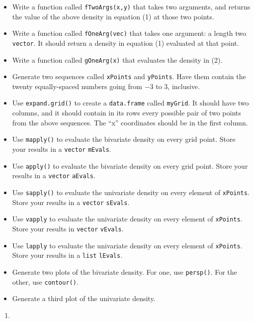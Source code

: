 \documentclass[
  12pt,
  krantz2]{krantz}
\providecommand{\tightlist}{%
  \setlength{\itemsep}{0pt}\setlength{\parskip}{0pt}}
\begin{document}
\begin{itemize}
\tightlist
\item
  Write a function called \texttt{fTwoArgs(x,y)} that takes two arguments, and returns the value of the above density in equation (1) at those two points.
\item
  Write a function called \texttt{fOneArg(vec)} that takes one argument: a length two \texttt{vector}. It should return a density in equation (1) evaluated at that point.
\item
  Write a function called \texttt{gOneArg(x)} that evaluates the density in (2).
\item
  Generate two sequences called \texttt{xPoints} and \texttt{yPoints}. Have them contain the twenty equally-spaced numbers going from \(-3\) to \(3\), inclusive.
\item
  Use \texttt{expand.grid()} to create a \texttt{data.frame} called \texttt{myGrid}. It should have two columns, and it should contain in its rows every possible pair of two points from the above sequences. The ``x'' coordinates should be in the first column.
\item
  Use \texttt{mapply()} to evaluate the bivariate density on every grid point. Store your results in a \texttt{vector} \texttt{mEvals}.
\item
  Use \texttt{apply()} to evaluate the bivariate density on every grid point. Store your results in a \texttt{vector} \texttt{aEvals}.
\item
  Use \texttt{sapply()} to evaluate the univariate density on every element of \texttt{xPoints}. Store your results in a \texttt{vector} \texttt{sEvals}.
\item
  Use \texttt{vapply} to evaluate the univariate density on every element of \texttt{xPoints}. Store your results in \texttt{vector} \texttt{vEvals}.
\item
  Use \texttt{lapply} to evaluate the univariate density on every element of \texttt{xPoints}. Store your results in a \texttt{list} \texttt{lEvals}.
\item
  Generate two plots of the bivariate density. For one, use \texttt{persp()}. For the other, use \texttt{contour()}.
\item
  Generate a third plot of the univariate density.
\end{itemize}

\begin{enumerate}
\def\labelenumi{\arabic{enumi}.}
\setcounter{enumi}{1}
\tightlist
\item
\end{enumerate}
\end{document}
